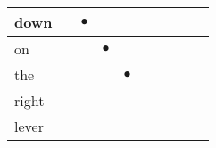 \documentclass[landscape]{article}
\newcommand{\ssp}{\hspace{2pt}}
\newcommand{\mex}{\cellcolor{g}$\bullet$}
\begin{document}
\begin{tabular}{|l|p{10pt}|p{10pt}|p{10pt}|p{10pt}|p{10pt}|p{10pt}|p{10pt}|p{10pt}|p{10pt}|}
\hline
\ssp \cellcolor{ref1}down \ssp&\hspace{2pt}&\hspace{2pt}\mex&\hspace{2pt}&\hspace{2pt}&\hspace{2pt}&\hspace{2pt}&\hspace{2pt}&\hspace{2pt}&\hspace{2pt}\\
\hline
\ssp \cellcolor{ref2}on \ssp&\hspace{2pt}&\hspace{2pt}&\hspace{2pt}\mex&\hspace{2pt}&\hspace{2pt}&\hspace{2pt}&\hspace{2pt}&\hspace{2pt}&\hspace{2pt}\\
\hline
\ssp \cellcolor{ref3}the \ssp&\hspace{2pt}&\hspace{2pt}&\hspace{2pt}&\hspace{2pt}\mex&\hspace{2pt}&\hspace{2pt}&\hspace{2pt}&\hspace{2pt}&\hspace{2pt}\\
\hline
\ssp right \ssp&\hspace{2pt}&\hspace{2pt}&\hspace{2pt}&\hspace{2pt}&\hspace{2pt}&\hspace{2pt}&\hspace{2pt}&\hspace{2pt}&\hspace{2pt}\\
\hline
\ssp lever \ssp&\hspace{2pt}&\hspace{2pt}&\hspace{2pt}&\hspace{2pt}&\hspace{2pt}&\hspace{2pt}&\hspace{2pt}&\hspace{2pt}&\hspace{2pt}\\

\end{tabular}
\end{document}
